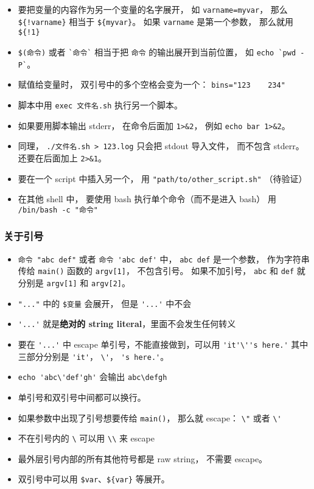 \begin{itemize}
\item 要把变量的内容作为另一个变量的名字展开， 如 \verb`varname=myvar`， 那么 \verb`${!varname}` 相当于 \verb`${myvar}`。 如果 \verb`varname` 是第一个参数， 那么就用 \verb`${!1}`
\item \verb`$(命令)` 或者 \verb|`命令`| 相当于把 \verb`命令` 的输出展开到当前位置， 如 \verb|echo `pwd -P`|。
\item 赋值给变量时， 双引号中的多个空格会变为一个： \verb`bins="123    234"`
\item 脚本中用 \verb`exec 文件名.sh` 执行另一个脚本。
\item 如果要用脚本输出 stderr， 在命令后面加 \verb`1>&2`， 例如 \verb`echo bar 1>&2`。
\item 同理， \verb`./文件名.sh > 123.log` 只会把 stdout 导入文件， 而不包含 stderr。 还要在后面加上 \verb`2>&1`。
\item 要在一个 script 中插入另一个， 用 \verb`"path/to/other_script.sh"` （待验证）
\item 在其他 shell 中， 要使用 bash 执行单个命令（而不是进入 bash） 用 \verb`/bin/bash -c "命令"`
\end{itemize}

\subsubsection{关于引号}
\begin{itemize}
\item \verb`命令 "abc def"` 或者 \verb`命令 'abc def'` 中， \verb`abc def` 是一个参数， 作为字符串传给 \verb`main()` 函数的 \verb`argv[1]`， 不包含引号。 如果不加引号， \verb`abc` 和 \verb`def` 就分别是 \verb`argv[1]` 和 \verb`argv[2]`。
\item \verb`"..."` 中的 \verb`$变量` 会展开， 但是 \verb`'...'` 中不会
\item \verb`'...'` 就是\textbf{绝对的 string literal}，里面不会发生任何转义
\item 要在 \verb`'...'` 中 escape 单引号，不能直接做到，可以用 \verb`'it'\''s here.'` 其中三部分分别是 \verb`'it'`， \verb`\'`， \verb`'s here.'`。
\item \verb`echo 'abc\'def'gh'` 会输出 \verb`abc\defgh`
\item 单引号和双引号中间都可以换行。
\item 如果参数中出现了引号想要传给 \verb`main()`， 那么就 escape： \verb`\"` 或者 \verb`\'`
\item 不在引号内的 \verb`\` 可以用 \verb`\\` 来 escape
\item 最外层引号内部的所有其他符号都是 raw string， 不需要 escape。
\item 双引号中可以用 \verb`$var`、\verb`${var}` 等展开。
\end{itemize}

